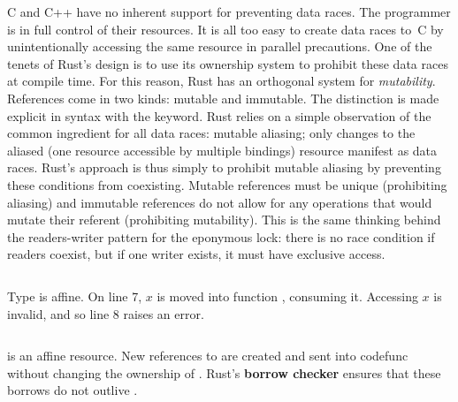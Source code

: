 C and C++ have no inherent support for preventing data races. The programmer is in full control of their resources. It is all too easy to create data races to~C by unintentionally accessing the same resource in parallel precautions. One of the tenets of Rust's design is to use its ownership system to prohibit these data races at compile time. For this reason, Rust has an orthogonal system for \textit{mutability}. References come in two kinds: mutable and immutable. The distinction is made explicit in syntax with the  keyword. Rust relies on a simple observation of the common ingredient for all data races: mutable aliasing; only changes to the aliased (one resource accessible by multiple bindings) resource manifest as data races. Rust's approach is thus simply to prohibit mutable aliasing by preventing these conditions from coexisting. Mutable references must be unique (prohibiting aliasing) and immutable references do not allow for any operations that would mutate their referent (prohibiting mutability). This is the same thinking behind the readers-writer pattern for the eponymous lock: there is no race condition if readers coexist, but if one writer exists, it must have exclusive access. 




\begin{listing}[ht]
	\centering
	\inputminted[]{rust}{move.rs}
	\caption[Example of move semantics in Rust.]{Type  is affine. On line 7, $x$ is moved into function , consuming it. Accessing $x$ is invalid, and so line 8 raises an error.}
	\label{listing:move}
\end{listing}

\begin{listing}[ht]
	\centering
	\inputminted[]{rust}{move2.rs}
	\caption[Example of borrowing in Rust.]{ is an affine resource. New references to  are created and sent into code{func} without changing the ownership of . Rust's \textbf{borrow checker} ensures that these borrows do not outlive .}
	\label{listing:move2}
\end{listing}


